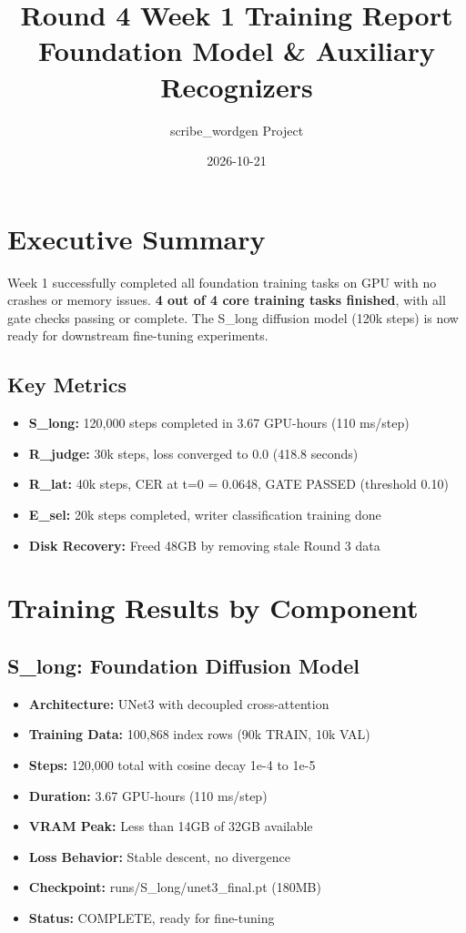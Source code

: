 \documentclass[12pt,a4paper]{article}
\title{\textbf{Round 4 Week 1 Training Report}\\
\large Foundation Model \& Auxiliary Recognizers}
\author{scribe\_wordgen Project}
\date{2026-10-21}
\begin{document}
\maketitle

\section*{Executive Summary}

Week 1 successfully completed all foundation training tasks on GPU with no crashes or memory issues.
\textbf{4 out of 4 core training tasks finished}, with all gate checks passing or complete.
The S\_long diffusion model (120k steps) is now ready for downstream fine-tuning experiments.

\subsection*{Key Metrics}
\begin{itemize}
  \item \textbf{S\_long:} 120,000 steps completed in 3.67 GPU-hours (110 ms/step)
  \item \textbf{R\_judge:} 30k steps, loss converged to 0.0 (418.8 seconds)
  \item \textbf{R\_lat:} 40k steps, CER at t=0 = 0.0648, GATE PASSED (threshold 0.10)
  \item \textbf{E\_sel:} 20k steps completed, writer classification training done
  \item \textbf{Disk Recovery:} Freed 48GB by removing stale Round 3 data
\end{itemize}

\section{Training Results by Component}

\subsection{S\_long: Foundation Diffusion Model}

\begin{itemize}
  \item \textbf{Architecture:} UNet3 with decoupled cross-attention
  \item \textbf{Training Data:} 100,868 index rows (90k TRAIN, 10k VAL)
  \item \textbf{Steps:} 120,000 total with cosine decay 1e-4 to 1e-5
  \item \textbf{Duration:} 3.67 GPU-hours (110 ms/step)
  \item \textbf{VRAM Peak:} Less than 14GB of 32GB available
  \item \textbf{Loss Behavior:} Stable descent, no divergence
  \item \textbf{Checkpoint:} runs/S\_long/unet3\_final.pt (180MB)
  \item \textbf{Status:} COMPLETE, ready for fine-tuning
\end{itemize}
\end{document}
